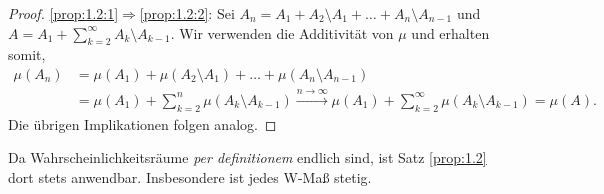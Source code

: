 \begin{proof}
\ref{prop:1.2:1}$\Rightarrow$\ref{prop:1.2:2}: Sei $A_n = A_1+A_2\setminus A_1
+ \ldots + A_n\setminus A_{n-1}$ und $A=A_1+\sum\limits_{k=2}^\infty
A_{k}\setminus A_{k-1}$. Wir verwenden die Additivität von $\mu$ und erhalten
somit,
\begin{align*} 
\mu\left(A_n\right) &= \mu(A_1) + \mu(A_2\setminus A_1) + \ldots +
\mu(A_n\setminus A_{n-1})\\
&= \mu(A_1) + \sum\limits_{k=2}^n \mu(A_k\setminus A_{k-1})
 \overset{n\to\infty}{\to} \mu(A_1) + \sum\limits_{k=2}^\infty \mu(A_k\setminus
 A_{k-1}) = \mu(A).
\end{align*}
Die übrigen Implikationen folgen analog.\qedhere
\end{proof}

Da Wahrscheinlichkeitsräume \textit{per definitionem} endlich sind, ist Satz
\ref{prop:1.2} dort stets anwendbar. Insbesondere ist jedes W-Maß stetig.

